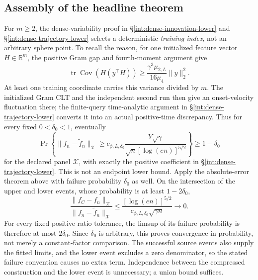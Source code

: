 \subsection{Assembly of the headline theorem}
\label{sec:panel-headline-proof}

For \(m\ge2\), the dense-variability proof in
\S\ref{int:dense-innovation-lower} and
\S\ref{int:dense-trajectory-lower} selects a deterministic
\emph{training index}, not an arbitrary sphere point.  To recall the
reason, for one initialized feature vector \(H\in\mathbb R^m\),
the positive Gram gap and fourth-moment argument give
\[
 \operatorname{tr}\operatorname{Cov}(H(y^\top H))
 \ge\frac{\gamma^3\mu_{2,L}}{16\mu_4}\|y\|_2^2.
\]
At least one training coordinate carries this variance divided by
\(m\).  The initialized Gram CLT and the independent second run
then give an onset-velocity fluctuation there; the finite-query
time-analytic argument in \S\ref{int:dense-trajectory-lower}
converts it into an actual positive-time discrepancy.  Thus for every
fixed \(0<\delta_0<1\), eventually
\[
 \Pr\left\{\|f_n-\widetilde f_n\|_{\mathcal X}\ge
       c_{\phi,L,\delta_0}\frac{Y\sqrt\gamma}
                    {\sqrt n[\log(en)]^{5/2}}\right\}
       \ge1-\delta_0
\]
for the declared panel \(\mathcal X\), with exactly the positive
coefficient in \S\ref{int:dense-trajectory-lower}.  This is not an
endpoint lower bound.  Apply the absolute-error theorem above with
failure probability \(\delta_0\) as well.  On the intersection of
the upper and lower events, whose probability is at least
\(1-2\delta_0\),
\[
 \frac{\|f_C-f_n\|_{\mathcal X}}
      {\|f_n-\widetilde f_n\|_{\mathcal X}}
 \le\frac{[\log(en)]^{5/2}}
 {c_{\phi,L,\delta_0}\sqrt{\gamma n}}
 \longrightarrow0.
\]
For every fixed positive ratio tolerance, the limsup of its failure
probability is therefore at most \(2\delta_0\).  Since
\(\delta_0\) is arbitrary, this proves convergence in probability,
not merely a constant-factor comparison.  The successful source events
also supply the fitted limits, and the lower event excludes a zero
denominator, so the stated failure convention causes no extra term.
Independence between the compressed construction and the lower event
is unnecessary; a union bound suffices.

